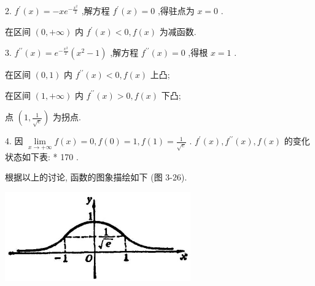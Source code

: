 \documentclass[lang=cn,newtx,12pt,scheme=chinese]{elegantbook}
\begin{document}
2. \({f}^{\prime }\left( x\right) = - x{e}^{-\frac{{x}^{2}}{2}}\) ,解方程 \({f}^{\prime }\left( x\right) = 0\) ,得驻点为 \(x = 0\) .

在区间 \(\left( {0, + \infty }\right)\) 内 \({f}^{\prime }\left( x\right) < 0,f\left( x\right)\) 为减函数.

3. \({f}^{\prime \prime }\left( x\right) = {e}^{-\frac{{x}^{2}}{2}}\left( {{x}^{2} - 1}\right)\) ,解方程 \({f}^{\prime \prime }\left( x\right) = 0\) ,得根 \(x = 1\) .

在区间 \(\left( {0,1}\right)\) 内 \({f}^{\prime \prime }\left( x\right) < 0,f\left( x\right)\) 上凸;

在区间 \(\left( {1, + \infty }\right)\) 内 \({f}^{\prime \prime }\left( x\right) > 0,f\left( x\right)\) 下凸;

点 \(\left( {1,\frac{1}{\sqrt{e}}}\right)\) 为拐点.

4. 因 \(\mathop{\lim }\limits_{{x \rightarrow + \infty }}f\left( x\right) = 0,f\left( 0\right) = 1,f\left( 1\right) = \frac{1}{\sqrt{e}}\) . \({f}^{\prime }\left( x\right) ,{f}^{\prime \prime }\left( x\right) ,f\left( x\right)\) 的变化状态如下表: * 170 .

\begin{center}
\end{center}

根据以上的讨论, 函数的图象描绘如下 (图 3-26).

\begin{center}
\includegraphics[max width=0.6\textwidth]{images/01912c18-5c3f-733d-b775-749ba9897a9d_174_141078.jpg}
\end{center}
\end{document}
